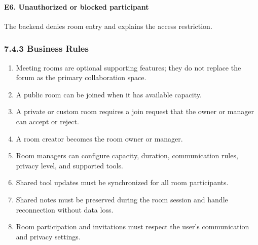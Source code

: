 \documentclass[12pt]{article}
\begin{document}
\paragraph*{E6. Unauthorized or blocked participant}
\par\medskip
The backend denies room entry and explains the access restriction.
\par\medskip
\hypertarget{sec:7-4-3-business-rules}{}
\subsubsection*{7.4.3 Business Rules}
\par\medskip
\begin{enumerate}
\item Meeting rooms are optional supporting features; they do not replace the forum as the primary collaboration space.
\item A public room can be joined when it has available capacity.
\item A private or custom room requires a join request that the owner or manager can accept or reject.
\item A room creator becomes the room owner or manager.
\item Room managers can configure capacity, duration, communication rules, privacy level, and supported tools.
\item Shared tool updates must be synchronized for all room participants.
\item Shared notes must be preserved during the room session and handle reconnection without data loss.
\item Room participation and invitations must respect the user's communication and privacy settings.
\end{enumerate}
\par\medskip
\hypertarget{sec:7-5-special-requirements}{}
\end{document}
